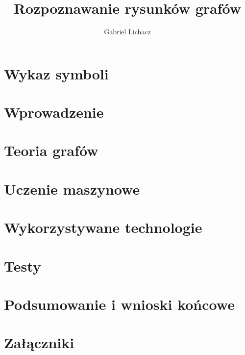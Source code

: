 \documentclass[12pt,twoside]{article}
\author{Gabriel Lichacz}
\title{Rozpoznawanie rysunków grafów}
\begin{document}
\maketitle

\blankpage

\tableofcontents

\clearpage
\blankpage

\section*{Wykaz symboli}

\clearpage

\section{Wprowadzenie}


\section{Teoria grafów}


\section{Uczenie maszynowe}


\section{Wykorzystywane technologie}


\section{Testy}


\section{Podsumowanie i wnioski końcowe}


\clearpage

\section*{Załączniki}


\clearpage



\clearpage

\makesummary
\end{document}
